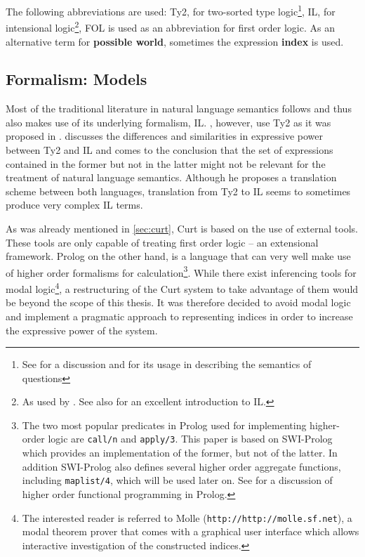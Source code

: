 \documentclass[a4paper]{article}
\newcommand{\abbr}{\textsf} %
\newcommand{\term}[1]{\textsf{\textbf{#1}}} %
\newcommand{\code}[1]{\texttt{#1}} %
\newcommand{\pn}{\textsf} %
\newcommand{\url}[1]{\code{http://#1}} %
\newcommand{\curt}{\pn{Curt}}
\newcommand{\prol}{\pn{Prolog}}
\theoremstyle{remark}
\theoremstyle{remark}
\theoremstyle{definition}
\theoremstyle{definition}
\begin{document}
The following abbreviations are used: 
\abbr{Ty2}, for two-sorted type logic\footnote{See \cite{gallin:ty2} for a
discussion and \cite{gs:sqpa} for its usage in describing the semantics of
questions}, \abbr{IL}, for intensional logic\footnote{As used by
\cite{ptq}. See also \cite{gamut:2} for an excellent introduction to \abbr{IL}.},
\abbr{FOL}  is used as an abbreviation for first order logic. As an alternative
term for \term{possible world}, sometimes the expression \term{index} is used.

\subsection{Formalism: Models}\label{sec:formal}

Most of the traditional literature in natural language semantics follows
\cite{ptq} and thus also makes use of its underlying formalism,
\abbr{IL}. \cite{gs:sqpa}, however, use \abbr{Ty2} as it was
proposed in \cite{gallin:ty2}. \cite{z:ilty2} discusses the differences and
similarities in expressive power between \abbr{Ty2} and \abbr{IL} and comes to
the conclusion that the set of expressions contained in the former but not in
the latter might not be relevant for the treatment of natural language
semantics. Although he proposes a translation scheme between both languages,
translation from \abbr{Ty2} to \abbr{IL} seems to sometimes produce very complex
\abbr{IL} terms.

As was already mentioned in \ref{sec:curt}, \curt{} is based on 
the use of external tools. These tools are only capable of treating first order logic – an
extensional framework. \prol{} on the other hand, is a language that can very well
make use of higher order formalisms for calculation\footnote{The two most
popular predicates in \prol{} used for implementing higher-order logic are
\code{call/n} and \code{apply/3}. This paper is based on \pn{SWI-Prolog} which
provides an implementation of the former, but not of the latter. In addition
\pn{SWI-Prolog} also defines several higher order aggregate functions, including
\code{maplist/4}, which will be used later on. See \cite{naish:prolhio} for a
discussion of higher order functional programming in \prol.}.  While there exist
inferencing tools for modal logic\footnote{ The interested reader is referred to
\pn{Molle} (\url{http://molle.sf.net}), a modal theorem prover that comes with a
graphical user interface which allows interactive investigation of the
constructed indices.}, a restructuring of the \curt{} system to take advantage
of them would be beyond the scope of this thesis.  It was therefore decided to
avoid modal logic and implement a pragmatic approach to representing indices in
order to increase the expressive power of the system.
\end{document}
